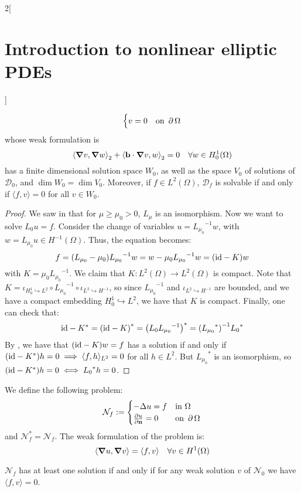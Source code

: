 \documentclass[../../../main_math.tex]{subfiles}
\begin{document}
\begin{multicols}{2}[\section{Introduction to nonlinear elliptic PDEs}]
\begin{proposition}
$$\begin{cases}
        v=0    & \text{on }\operatorname{\partial}{\Omega}
      \end{cases}
    $$
    whose weak formulation is
    \begin{equation*}
      {\langle \grad v,\grad w\rangle}_2+{\langle \boldsymbol{\mathrm{b}}\cdot \grad v,w\rangle}_2=0\quad \forall w\in H_0^1(\Omega)
    \end{equation*}
    has a finite dimensional solution space $W_0$, as well as the space $V_0$ of solutions of $\mathcal{D}_0$, and $\dim W_0=\dim V_0$. Moreover, if $f\in L^2(\Omega)$, $\mathcal{D}_f$ is solvable if and only if $\langle f,v\rangle=0$ for all $v\in W_0$.
  \end{proposition}
  \begin{proof}
    We saw in  that for $\mu\geq \mu_0>0$, $L_\mu$ is an isomorphism. Now we want to solve $L_0u=f$. Consider the change of variables $u={L_{\mu_0}}^{-1}w$, with $w=L_{\mu_0}u\in H^{-1}(\Omega)$. Thus, the equation becomes:
    $$
      f= (L_{\mu_0}-\mu_0){L_{\mu_0}}^{-1}w=w-\mu_0 {L_{\mu_0}}^{-1}w=(\mathrm{id}-K)w
    $$
    with $K=\mu_0 {L_{\mu_0}}^{-1}$. We claim that $K:L^2(\Omega)\to L^2(\Omega)$ is compact. Note that $K=\iota_{H_0^1\hookrightarrow L^2}\circ {L_{\mu_0}}^{-1}\circ \iota_{L^2\hookrightarrow H^{-1}}$, so since ${L_{\mu_0}}^{-1}$ and $\iota_{L^2\hookrightarrow H^{-1}}$ are bounded, and we have a compact embedding $H_0^1\hookrightarrow L^2$, we have that $K$ is compact. Finally, one can check that:
    $$
      \mathrm{id}-K^*={(\mathrm{id}-K)}^*={\left(L_0{L_{\mu_0}}^{-1}\right)}^*={({L_{\mu_0}}^*)}^{-1}{L_0}^{*}
    $$
    By , we have that $(\mathrm{id}-K)w=f$ has a solution if and only if $(\mathrm{id}-K^*)h=0\implies \langle f,h\rangle_{L^2} =0$ for all $h\in L^2$. But ${L_{\mu_0}}^*$ is an isomorphism, so $(\mathrm{id}-K^*)h=0\iff {L_0}^*h=0$.
  \end{proof}
  \begin{definition}
    We define the following problem:
    $$
      \mathcal{N}_f:=\begin{cases}
        -\Delta u=f   & \text{in }\Omega      \\
        \pdv{u}{\boldsymbol{\mathrm{n}}}=0 & \text{on }\operatorname{\partial}{\Omega}
      \end{cases}
    $$
    and $\mathcal{N}_f^*=\mathcal{N}_f$. The weak formulation of the problem is:
    \begin{equation*}
      \langle \grad u,\grad v\rangle=\langle f,v\rangle\quad \forall v\in H^1(\Omega)
    \end{equation*}
  \end{definition}
  \begin{proposition}
    $\mathcal{N}_f$ has at least one solution if and only if for any weak solution $v$ of $\mathcal{N}_0$ we have $\langle f,v\rangle=0$.
  \end{proposition}

\end{multicols}
\end{document}
